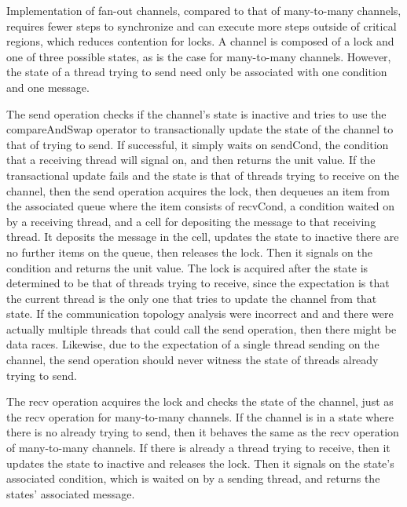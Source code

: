 \documentclass{article}
\begin{document}
Implementation of fan-out channels, compared to that of many-to-many channels, requires fewer
steps to synchronize and can execute more steps outside of critical regions, which reduces
contention for locks.  A channel is composed of a lock and one of three possible states, as is
the case for many-to-many channels.  However, the state of a thread trying to send need only be
associated with one condition and one message.  

The send operation checks if the channel's state is inactive and tries to use the
compareAndSwap operator to transactionally update the state of the channel to that of trying to
send.  If successful, it simply waits on sendCond, the condition that a receiving thread will
signal on, and then returns the unit value.  If the transactional update fails and the state is
that of threads trying to receive on the channel, then the send operation acquires the lock,
then dequeues an item from the associated queue where the item consists of recvCond, a
condition waited on by a receiving thread, and a cell for depositing the message to that
receiving thread.  It deposits the message in the cell, updates the state to inactive there are
no further items on the queue, then releases the lock.  Then it signals on the condition and
returns the unit value. The lock is acquired after the state is determined to be that of
threads trying to receive, since the expectation is that the current thread is the only one
that tries to update the channel from that state.  If the communication topology analysis were
incorrect and and there were actually multiple threads that could call the send operation, then
there might be data races.  Likewise, due to the expectation of a single thread sending on the
channel, the send operation should never witness the state of threads already trying to send.

The recv operation acquires the lock and checks the state of the channel, just as the recv
operation for many-to-many channels.  If the channel is in a state where there is no already
trying to send, then it behaves the same as the recv operation of many-to-many channels. If
there is already a thread trying to receive, then it updates the state to inactive and releases
the lock.  Then it signals on the state's associated condition, which is waited on by a sending
thread, and returns the states' associated message.
\end{document}
